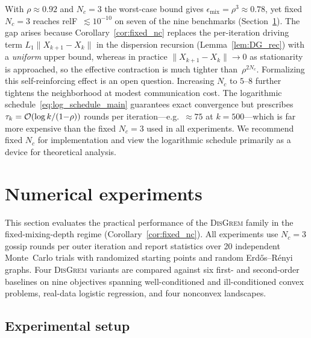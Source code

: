 \documentclass[review,onefignum,onetabnum]{siamart171218}
\begin{document}
\begin{remark}\label{rem:practical_implications}
With $\rho\approx 0.92$ and $N_c=3$ the worst-case bound gives
$\epsilon_{\mathrm{mix}}=\rho^3\approx 0.78$, yet fixed $N_c{=}3$
reaches relF~$\lesssim 10^{-10}$ on seven of the nine benchmarks
(Section~\ref{sec:experiments}).
The gap arises because Corollary~\ref{cor:fixed_nc} replaces the
per-iteration driving term $L_1\|X_{k+1}{-}X_k\|$ in the
dispersion recursion (Lemma~\ref{lem:DG_rec}) with a \emph{uniform}
upper bound, whereas in practice
$\|X_{k+1}{-}X_k\|\to 0$ as stationarity is approached, so the
effective contraction is much tighter than~$\rho^{2N_c}$.
Formalizing this self-reinforcing effect is an open question.
Increasing $N_c$ to $5$--$8$ further tightens the neighborhood at
modest communication cost.
The logarithmic schedule~\eqref{eq:log_schedule_main} guarantees
exact convergence but prescribes $\tau_k=\mathcal{O}(\log k/(1{-}\rho))$
rounds per iteration---e.g.\ ${\approx}75$ at $k{=}500$---which is
far more expensive than the fixed $N_c{=}3$ used in all experiments.
We recommend fixed $N_c$ for implementation and view the
logarithmic schedule primarily as a device for theoretical analysis.
\end{remark}




\section{Numerical experiments}\label{sec:experiments}

	This section evaluates the practical performance of the
	\textsc{DisGrem} family in the fixed-mixing-depth regime
	(Corollary~\ref{cor:fixed_nc}).
	All experiments use $N_c=3$ gossip rounds per outer iteration and
	report statistics over 20 independent Monte~Carlo trials with
	randomized starting points and random Erd\H{o}s--R\'{e}nyi graphs.
	Four \textsc{DisGrem} variants are compared against six first- and
	second-order baselines on nine objectives spanning well-conditioned
	and ill-conditioned convex problems, real-data logistic regression,
	and four nonconvex landscapes.
	
	\subsection{Experimental setup}\label{ssec:setup}
	
\end{document}
